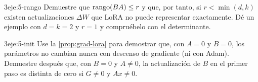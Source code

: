 \begin{ejercicio}{3}{eje:5-rango}
Demuestre que $\operatorname{rango}(BA)\le r$ y que, por tanto, si $r<\min(d,k)$ existen actualizaciones $\Delta W$ que LoRA no puede representar exactamente. Dé un ejemplo con $d=k=2$ y $r=1$ y compruébelo con el determinante.
\end{ejercicio}

\begin{ejercicio}{3}{eje:5-init}
Use la \cref{prop:grad-lora} para demostrar que, con $A=0$ y $B=0$, los parámetros no cambian nunca con descenso de gradiente (ni con Adam). Demuestre después que, con $B=0$ y $A\ne 0$, la actualización de $B$ en el primer paso es distinta de cero si $G\ne 0$ y $Ax\ne 0$.
\end{ejercicio}
